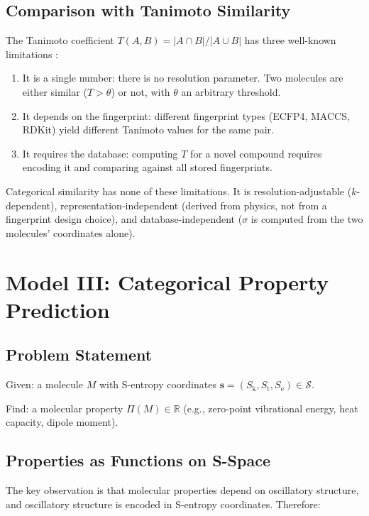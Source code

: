 \documentclass[11pt,twocolumn,a4paper]{article}
\theoremstyle{definition}
\theoremstyle{remark}
\newcommand{\Sk}{S_{\mathrm{k}}}
\newcommand{\St}{S_{\mathrm{t}}}
\newcommand{\Se}{S_{\mathrm{e}}}
\newcommand{\Sspace}{\mathcal{S}}
\newcommand{\Real}{\mathbb{R}}
\begin{document}
\subsection{Comparison with Tanimoto Similarity}

The Tanimoto coefficient $T(A,B) = |A \cap B|/|A \cup B|$ has three well-known limitations \citep{bajusz2015}:
\begin{enumerate}[nosep]
\item It is a single number: there is no resolution parameter. Two molecules are either similar ($T > \theta$) or not, with $\theta$ an arbitrary threshold.
\item It depends on the fingerprint: different fingerprint types (ECFP4, MACCS, RDKit) yield different Tanimoto values for the same pair.
\item It requires the database: computing $T$ for a novel compound requires encoding it and comparing against all stored fingerprints.
\end{enumerate}

Categorical similarity has none of these limitations. It is resolution-adjustable ($k$-dependent), representation-independent (derived from physics, not from a fingerprint design choice), and database-independent ($\sigma$ is computed from the two molecules' coordinates alone).


\section{Model III: Categorical Property Prediction}
\label{sec:model3}

\subsection{Problem Statement}

Given: a molecule $M$ with S-entropy coordinates $\mathbf{s} = (\Sk, \St, \Se) \in \Sspace$.

Find: a molecular property $\Pi(M) \in \Real$ (e.g., zero-point vibrational energy, heat capacity, dipole moment).

\subsection{Properties as Functions on S-Space}

The key observation is that molecular properties depend on oscillatory structure, and oscillatory structure is encoded in S-entropy coordinates. Therefore:
\end{document}
